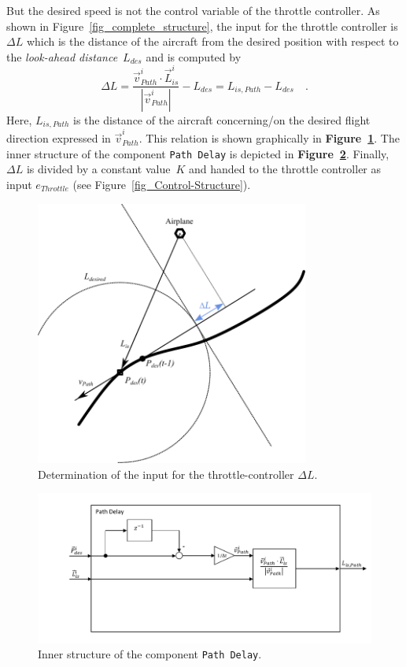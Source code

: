 \documentclass[11pt,a4paper]{scrartcl}		%
\begin{document}
But the desired speed is not the control variable of the throttle controller. As shown in Figure~\ref{fig_complete_structure}, the input for the throttle controller is $\Delta L$ which is the distance of the aircraft from the desired position with respect to the \textsl{look-ahead distance}~$L_{des}$ and is computed by
\begin{equation}
\Delta L = \frac{\vec{v}_{Path}^i \cdot \vec{L}_{is}^i}{|\vec{v}_{Path}^i|}-L_{des} = L_{is,Path}-L_{des} \quad .
\end{equation}
Here, $L_{is,Path}$ is the distance of the aircraft concerning/on the desired flight direction expressed in $\vec{v}_{Path}^i$.
This relation is shown graphically in \textbf{Figure~\ref{fig_explanation-diagram-throttle}}. The inner structure of the component \texttt{Path Delay} is depicted in \textbf{Figure~\ref{fig_Path_Delay}}.
Finally, $\Delta L$ is divided by a constant value~$K$ and handed to the throttle controller as input $e_{Throttle}$ (see Figure~\ref{fig_Control-Structure}).

\begin{figure}[bth]
  \begin{center}
  	\includegraphics[width=9cm]{pictures/explanation-diagram-throttle.pdf}
  \end{center}
  \caption{Determination of the input for the throttle-controller $\Delta L$.}
  \label{fig_explanation-diagram-throttle}
\end{figure}

\begin{figure}[tbh]
  \begin{center}
  	\includegraphics[width=14cm]{pictures/Path_Delay.pdf}
  \end{center}
  \caption{Inner structure of the component \texttt{Path Delay}.}
  \label{fig_Path_Delay}
\end{figure} 
\end{document}
